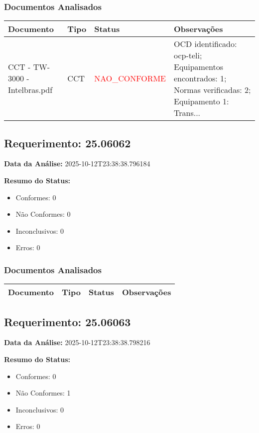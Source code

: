 \documentclass[12pt,a4paper]{article}
\begin{document}
\subsubsection{Documentos Analisados}

\begin{longtable}{|p{4cm}|p{2cm}|p{2cm}|p{6cm}|}
\hline
\textbf{Documento} & \textbf{Tipo} & \textbf{Status} & \textbf{Observações} \\
\hline
\endhead
CCT - TW-3000 - Intelbras.pdf & CCT & \textcolor{red}{NAO\_CONFORME} & OCD identificado: ocp-teli; Equipamentos encontrados: 1; Normas verificadas: 2; Equipamento 1: Trans... \\
\hline
\end{longtable}


\subsection{Requerimento: 25.06062}

\textbf{Data da Análise:} 2025-10-12T23:38:38.796184

\textbf{Resumo do Status:}
\begin{itemize}
    \item Conformes: 0
    \item Não Conformes: 0
    \item Inconclusivos: 0
    \item Erros: 0
\end{itemize}

\subsubsection{Documentos Analisados}

\begin{longtable}{|p{4cm}|p{2cm}|p{2cm}|p{6cm}|}
\hline
\textbf{Documento} & \textbf{Tipo} & \textbf{Status} & \textbf{Observações} \\
\hline
\endhead
\end{longtable}


\subsection{Requerimento: 25.06063}

\textbf{Data da Análise:} 2025-10-12T23:38:38.798216

\textbf{Resumo do Status:}
\begin{itemize}
    \item Conformes: 0
    \item Não Conformes: 1
    \item Inconclusivos: 0
    \item Erros: 0
\end{itemize}
\end{document}
